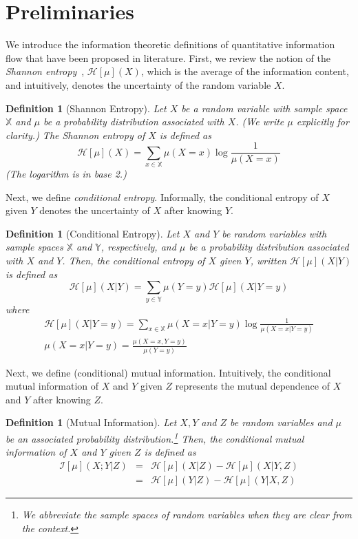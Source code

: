 \documentclass{llncs}
\newtheorem{definition}[theorem]{Definition}
\begin{document}
\section{Preliminaries}

\label{sec:prelim}

We introduce the information theoretic definitions of quantitative
information flow that have been proposed in literature.  First, we
review the notion of the {\em Shannon entropy}~\cite{shannon48},
$\mathcal{H}[\mu](X)$, which is the average of the information
content, and intuitively, denotes the uncertainty of the random
variable $X$.
\begin{definition}[Shannon Entropy]
  Let $X$ be a random variable with sample space $\mathbb X$ and $\mu$
  be a probability distribution associated with $X$.  (We write $\mu$
  explicitly for clarity.)  The Shannon entropy of $X$ is defined as
\[
\mathcal{H}[\mu](X)=\sum_{x\in\mathbb{X}} \mu(X=x)\log\frac{1}{\mu(X=x)}
\]
(The logarithm is in base 2.)
\end{definition}
Next, we define {\em conditional entropy}.  Informally, the conditional
entropy of $X$ given $Y$ denotes the uncertainty of $X$ after knowing
$Y$.
\begin{definition}[Conditional Entropy]
Let $X$ and $Y$ be random variables with sample spaces $\mathbb X$ and
$\mathbb Y$, respectively, and $\mu$ be a probability distribution
associated with $X$ and $Y$.  Then, the conditional entropy of $X$
given $Y$, written $\mathcal{H}[\mu](X|Y)$ is defined as
\[
\mathcal{H}[\mu](X|Y)=\sum_{y\in\mathbb Y} \mu(Y=y) \mathcal{H}[\mu](X|Y=y)
\]
where
\[
\begin{array}{l}
\mathcal{H}[\mu](X|Y=y)
=\sum_{x\in\mathbb X} \mu(X=x|Y=y)\log\frac{1}{\mu(X=x|Y=y)} \\
\mu(X=x|Y=y)=\frac{\mu(X=x,Y=y)}{\mu(Y=y)}
\end{array}
\]
\end{definition}
Next, we define (conditional) mutual information.  Intuitively, the
conditional mutual information of $X$ and $Y$ given $Z$ represents the
mutual dependence of $X$ and $Y$ after knowing $Z$.
\begin{definition}[Mutual Information]
  Let $X, Y$ and $Z$ be random variables and $\mu$ be an associated
  probability distribution.\footnote{We abbreviate the sample spaces
    of random variables when they are clear from the context.}  Then,
  the conditional mutual information of $X$ and $Y$ given $Z$ is
  defined as
\[
\begin{array}{rcl}
\mathcal{I}[\mu](X;Y|Z)&=&\mathcal{H}[\mu](X|Z)-\mathcal{H}[\mu](X|Y,Z)\\
&=&\mathcal{H}[\mu](Y|Z)-\mathcal{H}[\mu](Y|X,Z)
\end{array}
\]
\end{definition}
\end{document}

